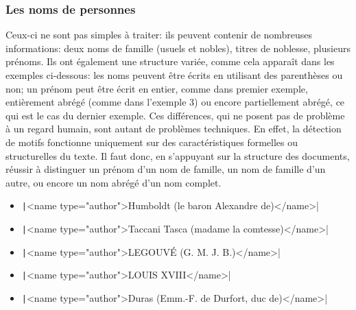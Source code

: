 \subsubsection{Les noms de personnes}
Ceux-ci ne sont pas simples à traiter: ils peuvent contenir de nombreuses informations: deux noms de famille (usuels et nobles), titres de noblesse, plusieurs prénoms. Ils ont également une structure variée, comme cela apparaît dans les exemples ci-dessous: les noms peuvent être écrits en utilisant des parenthèses ou non; un prénom peut être écrit en entier, comme dans premier exemple, entièrement abrégé (comme dans l'exemple 3) ou encore partiellement abrégé, ce qui est le cas du dernier exemple. Ces différences, qui ne posent pas de problème à un regard humain, sont autant de problèmes techniques. En effet, la détection de motifs fonctionne uniquement sur des caractéristiques formelles ou structurelles du texte. Il faut donc, en s'appuyant sur la structure des documents, réussir à distinguer un prénom d'un nom de famille, un nom de famille d'un autre, ou encore un nom abrégé d'un nom complet.
\begin{itemize}
	\item \texttt|<name type="author">Humboldt (le baron Alexandre de)</name>|
	\item \texttt|<name type="author">Taccani Tasca (madame la comtesse)</name>|
	\item \texttt|<name type="author">LEGOUVÉ (G. M. J. B.)</name>|
	\item \texttt|<name type="author">LOUIS XVIII</name>|
	\item \texttt|<name type="author">Duras (Emm.-F. de Durfort, duc de)</name>|
\end{itemize}

